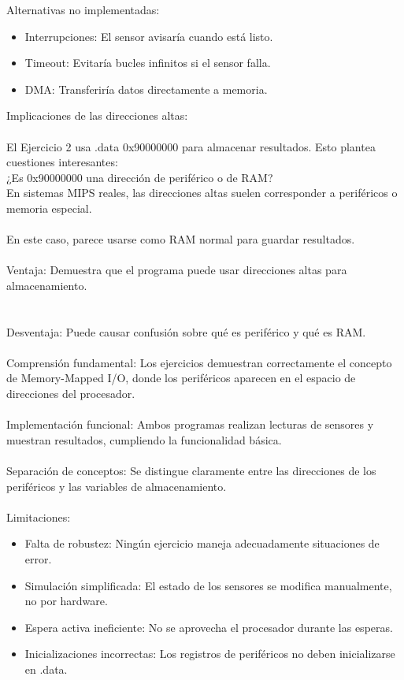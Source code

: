 \documentclass{article}
\begin{document}
Alternativas no implementadas:
\begin{itemize}
    \item Interrupciones: El sensor avisaría cuando está listo.
    \item Timeout: Evitaría bucles infinitos si el sensor falla.
    \item DMA: Transferiría datos directamente a memoria.
\end{itemize}
Implicaciones de las direcciones altas:\\
\\
El Ejercicio 2 usa .data 0x90000000 para almacenar resultados. Esto plantea cuestiones interesantes:
\\
¿Es 0x90000000 una dirección de periférico o de RAM?
\\
En sistemas MIPS reales, las direcciones altas suelen corresponder a periféricos o memoria especial.
\\
\\
En este caso, parece usarse como RAM normal para guardar resultados.
\\
\\
Ventaja: Demuestra que el programa puede usar direcciones altas para almacenamiento.\\
\\
\\
Desventaja: Puede causar confusión sobre qué es periférico y qué es RAM.
\\
\\
Comprensión fundamental: Los ejercicios demuestran correctamente el concepto de Memory-Mapped I/O, donde los periféricos aparecen en el espacio de direcciones del procesador.
\\
\\
Implementación funcional: Ambos programas realizan lecturas de sensores y muestran resultados, cumpliendo la funcionalidad básica.
\\
\\
Separación de conceptos: Se distingue claramente entre las direcciones de los periféricos y las variables de almacenamiento.
\\
\\
Limitaciones:
\begin{itemize}
    \item Falta de robustez: Ningún ejercicio maneja adecuadamente situaciones de error.
    \item Simulación simplificada: El estado de los sensores se modifica manualmente, no por hardware.
    \item Espera activa ineficiente: No se aprovecha el procesador durante las esperas.
    \item Inicializaciones incorrectas: Los registros de periféricos no deben inicializarse en .data.
\end{itemize}
\end{document}
